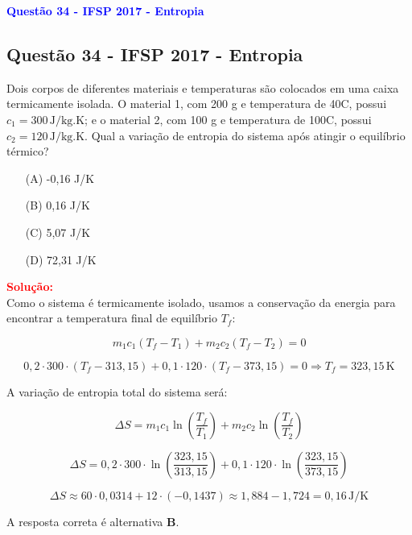 \begin{flushleft}
\textbf{\textcolor{blue}{\Large Quest\~ao 34 - IFSP 2017 - Entropia}}\\
\noindent

\subsection{Quest\~ao 34 - IFSP 2017 - Entropia}
Dois corpos de diferentes materiais e temperaturas s\~ao colocados em uma caixa termicamente isolada. 
O material 1, com 200 g e temperatura de 40\textdegree C, possui $c_1 = 300 \, \text{J/kg.K}$; e o material 2, 
com 100 g e temperatura de 100\textdegree C, possui $c_2 = 120 \, \text{J/kg.K}$. Qual a varia\c{c}\~ao de entropia do 
sistema ap\'os atingir o equil\'ibrio t\'ermico?

\begin{itemize}
\item[(A)] -0,16 J/K
\item[(B)] 0,16 J/K
\item[(C)] 5,07 J/K
\item[(D)] 72,31 J/K
\end{itemize}

\vspace{0.5cm}

\textcolor{red}{\textbf{Solução:}}\\

Como o sistema é termicamente isolado, usamos a conserva\c{c}\~ao da energia para encontrar a temperatura final de equil\'ibrio $T_f$:

\[
m_1 c_1 (T_f - T_1) + m_2 c_2 (T_f - T_2) = 0
\]

\[
0{,}2 \cdot 300 \cdot (T_f - 313{,}15) + 0{,}1 \cdot 120 \cdot (T_f - 373{,}15) = 0
\Rightarrow T_f = 323{,}15\, \text{K}
\]

A varia\c{c}\~ao de entropia total do sistema ser\'a:

\[
\Delta S = m_1 c_1 \ln \left( \frac{T_f}{T_1} \right) + m_2 c_2 \ln \left( \frac{T_f}{T_2} \right)
\]

\[
\Delta S = 0{,}2 \cdot 300 \cdot \ln\left( \frac{323{,}15}{313{,}15} \right) + 0{,}1 \cdot 120 \cdot \ln\left( \frac{323{,}15}{373{,}15} \right)
\]

\[
\Delta S \approx 60 \cdot 0{,}0314 + 12 \cdot (-0{,}1437) \approx 1{,}884 - 1{,}724 = \boxed{0{,}16 \, \text{J/K}}
\]

A resposta correta é alternativa \colorbox{green!50}{\textbf{B}}.

\end{flushleft}


